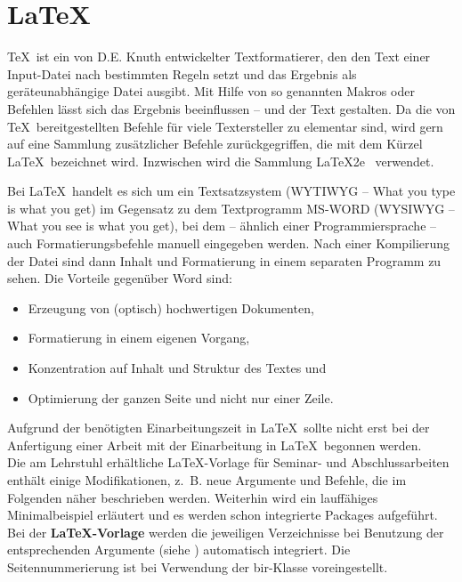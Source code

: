 \section{\LaTeX\index{\LaTeX}}
\label{chap:latex}
\TeX \ ist ein von D.E. Knuth entwickelter Textformatierer, den den Text einer Input-Datei nach bestimmten Regeln setzt und das Ergebnis als geräteunabhängige Datei ausgibt. Mit Hilfe von so genannten Makros oder Befehlen lässt sich das Ergebnis beeinflussen -- und der Text gestalten. Da die von \TeX \ bereitgestellten Befehle für viele Textersteller zu elementar sind, wird gern auf eine Sammlung zusätzlicher Befehle zurückgegriffen, die mit dem Kürzel \LaTeX \ bezeichnet wird. Inzwischen wird die Sammlung \LaTeX2e \ verwendet.


Bei \LaTeX \ handelt es sich um ein Textsatzsystem (WYTIWYG -- What you type is what you get) im Gegensatz zu dem Textprogramm MS-WORD (WYSIWYG -- What you see is what you get), bei dem -- ähnlich einer Programmiersprache -- auch Formatierungsbefehle manuell eingegeben werden. Nach einer Kompilierung der Datei sind dann Inhalt und Formatierung in einem separaten Programm zu sehen. Die Vorteile gegenüber Word sind:
\begin{itemize}
\item Erzeugung von (optisch) hochwertigen Dokumenten,
\item Formatierung in einem eigenen Vorgang,
\item Konzentration auf Inhalt und Struktur des Textes und
\item Optimierung der ganzen Seite und nicht nur einer Zeile.
\end{itemize}

Aufgrund der benötigten Einarbeitungszeit in \LaTeX \ sollte nicht erst bei der Anfertigung einer Arbeit mit der Einarbeitung in \LaTeX \ begonnen werden. \\

Die am Lehrstuhl erhältliche \LaTeX-Vorlage für Seminar- und Abschlussarbeiten enthält einige Modifikationen, z.~B. neue Argumente und Befehle, die im Folgenden näher beschrieben werden. Weiterhin wird ein lauffähiges Minimalbeispiel erläutert und es werden schon integrierte Packages aufgeführt.\\Bei der \textbf{\LaTeX-Vorlage} werden die jeweiligen Verzeichnisse bei Benutzung der entsprechenden Argumente (siehe ) automatisch integriert. Die Seitennummerierung ist bei Verwendung der bir-Klasse voreingestellt.

